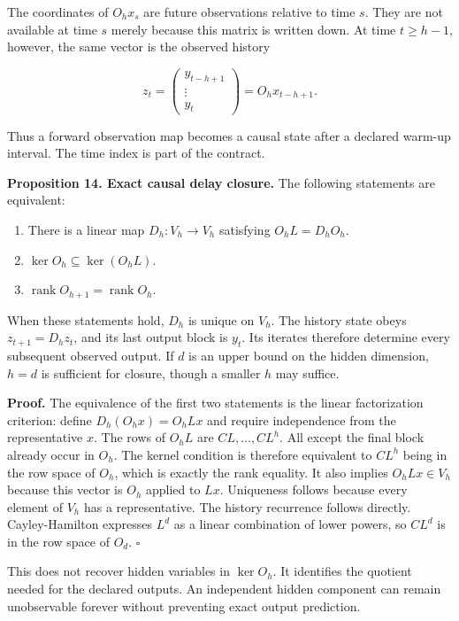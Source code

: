 The coordinates of \(O_hx_s\) are future observations relative to time
\(s\). They are not available at time \(s\) merely because this matrix
is written down. At time \(t\geq h-1\), however, the same vector is the
observed history

\[
z_t=\begin{pmatrix}y_{t-h+1}\\\vdots\\y_t\end{pmatrix}
=O_hx_{t-h+1}.
\]

Thus a forward observation map becomes a causal state after a declared
warm-up interval. The time index is part of the contract.

\textbf{Proposition 14. Exact causal delay closure.} The following
statements are equivalent:

\begin{enumerate}
\def\labelenumi{\arabic{enumi}.}
\LSMtightlist
\item
  There is a linear map \(D_h:V_h\to V_h\) satisfying \(O_hL=D_hO_h\).
\item
  \(\ker O_h\subseteq\ker(O_hL)\).
\item
  \(\operatorname{rank}O_{h+1}=\operatorname{rank}O_h\).
\end{enumerate}

When these statements hold, \(D_h\) is unique on \(V_h\). The history
state obeys \(z_{t+1}=D_hz_t\), and its last output block is \(y_t\).
Its iterates therefore determine every subsequent observed output. If
\(d\) is an upper bound on the hidden dimension, \(h=d\) is sufficient
for closure, though a smaller \(h\) may suffice.

\textbf{Proof.} The equivalence of the first two statements is the
linear factorization criterion: define \(D_h(O_hx)=O_hLx\) and require
independence from the representative \(x\). The rows of \(O_hL\) are
\(CL,\ldots,CL^h\). All except the final block already occur in \(O_h\).
The kernel condition is therefore equivalent to \(CL^h\) being in the
row space of \(O_h\), which is exactly the rank equality. It also
implies \(O_hLx\in V_h\) because this vector is \(O_h\) applied to
\(Lx\). Uniqueness follows because every element of \(V_h\) has a
representative. The history recurrence follows directly. Cayley-Hamilton
expresses \(L^d\) as a linear combination of lower powers, so \(CL^d\)
is in the row space of \(O_d\). \(\square\)

This does not recover hidden variables in \(\ker O_h\). It identifies
the quotient needed for the declared outputs. An independent hidden
component can remain unobservable forever without preventing exact
output prediction.

